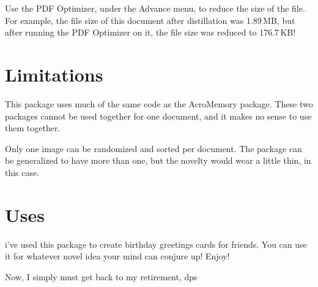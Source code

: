 \documentclass{article}
\begin{document}
Use the \textsf{PDF Optimizer}, under the \textsf{Advance} menu, to
reduce the size of the file. For example, the file size of this
document after distillation was 1.89\,MB, but after running the
PDF Optimizer on it, the file size was reduced to 176.7\,KB!

\section{Limitations}

This package uses much of the same code as the \textsf{AcroMemory}
package. These two packages cannot be used together for one
document, and it makes no sense to use them together.

Only one image can be randomized and sorted per document.  The
package can be generalized to have more than one, but the novelty
would wear a little thin, in this case.

\section{Uses}

i've used this package to create birthday greetings cards for
friends. You can use it for whatever novel idea your mind can
conjure up! Enjoy!

Now, I simply must get back to my retirement, dps
\end{document}
